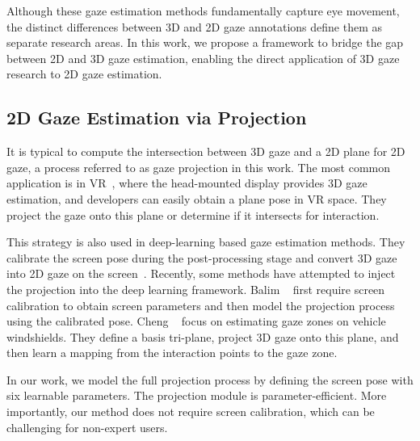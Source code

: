 Although these gaze estimation methods fundamentally capture eye movement, the distinct differences between 3D and 2D gaze annotations define them as separate research areas. In this work, we propose a framework to bridge the gap between 2D and 3D gaze estimation, enabling the direct application of 3D gaze research to 2D gaze estimation.



\subsection{2D Gaze Estimation via Projection}
It is typical to compute the intersection between 3D gaze and a 2D plane for 2D gaze, a process referred to as gaze projection in this work. The most common application is in VR~\cite{2017_gazevr,2021_gazevr}, where the head-mounted display provides 3D gaze estimation, and developers can easily obtain a plane pose in VR space. They project the gaze onto this plane or determine if it intersects for interaction.

This strategy is also used in deep-learning based gaze estimation methods.
They calibrate the screen pose during the post-processing stage and convert 3D gaze into 2D gaze on the screen~\cite{Cheng_2024_pami,Zhang_2019_CHI}.
Recently, some methods have attempted to inject the projection into the deep learning framework. Balim \etal ~\cite{Balim_2023_CVPR} first require screen calibration to obtain screen parameters and then model the projection process using the calibrated pose.
Cheng \etal~\cite{cheng2024ivgaze} focus on estimating gaze zones on vehicle windshields. They define a basis tri-plane, project 3D gaze onto this plane, and then learn a mapping from the interaction points to the gaze zone.


In our work, we model the full projection process by defining the screen pose with six learnable parameters. The projection module is parameter-efficient. More importantly, our method does not require screen calibration, which can be challenging for non-expert users.

